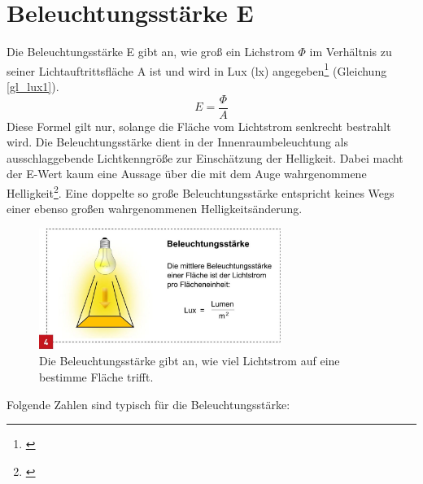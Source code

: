 \section{Beleuchtungsstärke E}\label{sec_lux}
Die Beleuchtungsstärke E gibt an, wie groß ein Lichstrom $\Phi$ im Verhältnis zu seiner Lichtauftrittsfläche A ist  und wird in Lux (lx) angegeben\footnote{\cite[28]{ris}} (Gleichung \ref{gl_lux1}).
 \begin{equation}\label{gl_lux1}
	E=\frac{\Phi}{A}	
\end{equation}
Diese Formel gilt nur, solange die Fläche vom Lichtstrom senkrecht bestrahlt wird. Die Beleuchtungsstärke dient in der Innenraumbeleuchtung als ausschlaggebende Lichtkenngröße zur Einschätzung der Helligkeit. Dabei macht der E-Wert kaum eine Aussage über die mit dem Auge wahrgenommene Helligkeit\footnote{\cite[29]{ris}}. Eine doppelte so große Beleuchtungsstärke entspricht keines Wegs einer ebenso großen wahrgenommenen Helligkeitsänderung.

\begin{figure}[H]     %
\centering
\includegraphics[width=0.7\textwidth]{bilder/lux} 
\caption {Die Beleuchtungsstärke gibt an, wie viel Lichtstrom auf eine bestimme Fläche trifft.\protect\footnotemark}\label{b_lux}
\end{figure}


Folgende Zahlen sind typisch für die Beleuchtungsstärke:

